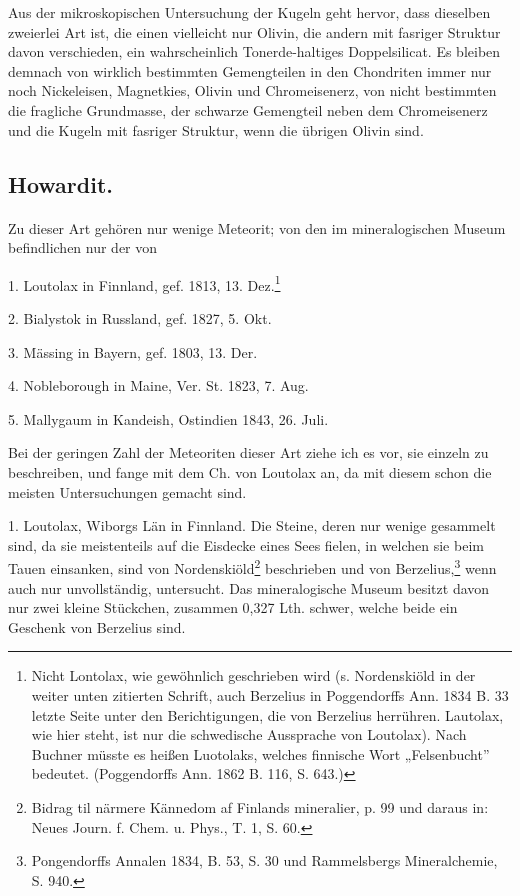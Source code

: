 \documentclass[a4paper, 11pt, oneside]{article}
\begin{document}
Aus der mikroskopischen Untersuchung der Kugeln geht hervor, dass dieselben zweierlei Art ist, die einen vielleicht nur Olivin, die andern mit fasriger Struktur davon verschieden, ein wahrscheinlich Tonerde-haltiges Doppelsilicat. Es bleiben demnach von wirklich bestimmten Gemengteilen in den Chondriten immer nur noch Nickeleisen, Magnetkies, Olivin und Chromeisenerz, von nicht bestimmten die fragliche Grundmasse, der schwarze Gemengteil neben dem Chromeisenerz und die Kugeln mit fasriger Struktur, wenn die übrigen Olivin sind.
\subsection{Howardit.}
\paragraph{}
Zu dieser Art gehören nur wenige Meteorit; von den im mineralogischen Museum befindlichen nur der von

1. Loutolax in Finnland, gef. 1813, 13. Dez.\footnote{Nicht Lontolax, wie gewöhnlich geschrieben wird (s. Nordenskiöld in der weiter unten zitierten Schrift, auch Berzelius in Poggendorffs Ann. 1834 B. 33 letzte Seite unter den Berichtigungen, die von Berzelius herrühren. Lautolax, wie hier steht, ist nur die schwedische Aussprache von Loutolax). Nach Buchner müsste es heißen Luotolaks, welches finnische Wort „Felsenbucht” bedeutet. (Poggendorffs Ann. 1862 B. 116, S. 643.)}

2. Bialystok in Russland, gef. 1827, 5. Okt.

3. Mässing in Bayern, gef. 1803, 13. Der.

4. Nobleborough in Maine, Ver. St. 1823, 7. Aug.

5. Mallygaum in Kandeish, Ostindien 1843, 26. Juli.

Bei der geringen Zahl der Meteoriten dieser Art ziehe ich es vor, sie einzeln zu beschreiben, und fange mit dem Ch. von Loutolax an, da mit diesem schon die meisten Untersuchungen gemacht sind.

1. Loutolax, Wiborgs Län in Finnland. Die Steine, deren nur wenige gesammelt sind, da sie meistenteils auf die Eisdecke eines Sees fielen, in welchen sie beim Tauen einsanken, sind von Nordenskiöld\footnote{Bidrag til närmere Kännedom af Finlands mineralier, p. 99 und daraus in: Neues Journ. f. Chem. u. Phys., T. 1, S. 60.} beschrieben und von Berzelius,\footnote{Pongendorffs Annalen 1834, B. 53, S. 30 und Rammelsbergs Mineralchemie, S. 940.} wenn auch nur unvollständig, untersucht. Das mineralogische Museum besitzt davon nur zwei kleine Stückchen, zusammen 0,327 Lth. schwer, welche beide ein Geschenk von Berzelius sind.
\end{document}
